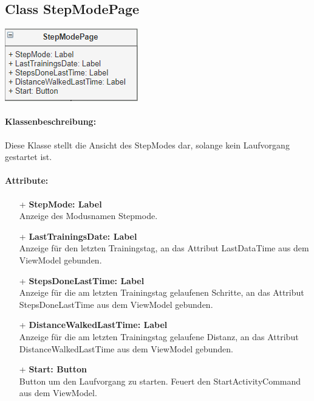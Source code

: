 \documentclass[a4paper,12pt]{article}
\begin{document}
\begin{minipage}[b]{0.7\textwidth}
	\subsection{Class StepModePage}
\end{minipage}
\begin{minipage}[c]{0.3\textwidth}
	\includegraphics[width=\textwidth]{bilder/ViewKlassen/StepModePage.png}
\end{minipage}
\paragraph{Klassenbeschreibung:}
Diese Klasse stellt die Ansicht des StepModes dar, solange kein Laufvorgang gestartet ist.
\paragraph{Attribute:}
	\begin{itemize}
	\item[+] \textbf{StepMode: Label} \\ Anzeige des Modusnamen Stepmode.
	\item[+] \textbf{LastTrainingsDate: Label} \\ Anzeige für den letzten Trainingstag, an das Attribut LastDataTime aus dem ViewModel gebunden.
	\item[+] \textbf{StepsDoneLastTime: Label} \\ Anzeige für die am letzten Trainingstag gelaufenen Schritte, an das Attribut StepsDoneLastTime aus dem ViewModel gebunden.
	\item[+] \textbf{DistanceWalkedLastTime: Label} \\ Anzeige für die am letzten Trainingstag gelaufene Distanz, an das Attribut DistanceWalkedLastTime aus dem ViewModel gebunden. 
	\item[+] \textbf{Start: Button} \\ Button um den Laufvorgang zu starten. Feuert den StartActivityCommand aus dem ViewModel.
	\end{itemize}
\end{document}

